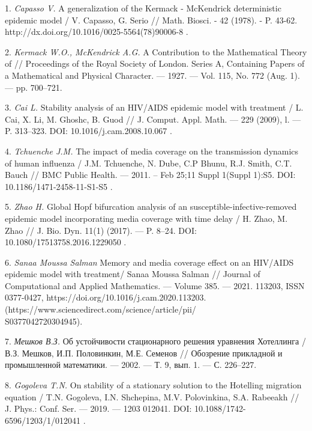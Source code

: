 \litlist

1. {\it  Capasso V.} A generalization of the Kermack - McKendrick
deterministic epidemic model / V. Capasso, G. Serio // Math.
Biosci. - 42 (1978). - P. 43-62.
http://dx.doi.org/10.1016/0025-5564(78)90006-8 .

2. {\it  Kermack W.O.,  McKendrick A.G.} A Contribution to the
Mathematical Theory of  // Proceedings of the Royal Society of
London. Series A, Containing Papers of a Mathematical and Physical
Character. --- 1927. --- Vol. 115, No. 772 (Aug. 1). --- pp.
700--721.

3. {\it   Cai L.} Stability analysis of an HIV/AIDS epidemic model
with treatment / L. Cai, X. Li, M. Ghoshc, B. Guod // J. Comput.
Appl. Math. --- 229 (2009), l. --- P. 313--323. DOI:
10.1016/j.cam.2008.10.067 .

4.  {\it Tchuenche J.M.} The impact of media coverage on the
transmission dynamics of human influenza / J.M. Tchuenche, N.
Dube, C.P Bhunu, R.J. Smith, C.T. Bauch // BMC Public Health. ---
2011. -- Feb 25;11 Suppl 1(Suppl 1):S5. DOI:
10.1186/1471-2458-11-S1-S5 .

5. {\it Zhao H.} Global Hopf bifurcation analysis of an
susceptible-infective-removed epidemic model incorporating media
coverage with time delay / H. Zhao, M. Zhao // J. Bio. Dyn. 11(1)
(2017). --- P. 8--24. DOI: 10.1080/17513758.2016.1229050 .

6. {\it Sanaa Moussa Salman} Memory and media coverage effect on
an HIV/AIDS epidemic model with treatment/ Sanaa Moussa Salman //
Journal of Computational and Applied Mathematics. --- Volume 385.
--- 2021. 113203, ISSN 0377-0427,
https://doi.org/10.1016/j.cam.2020.113203.
(https://www.sciencedirect.com/science/article/pii/\\S0377042720304945).


7. {\it  Мешков В.З.} Об устойчивости стационарного решения
уравнения Хотеллинга / В.З.  Мешков, И.П. Половинкин, М.Е. Семенов
// Обозрение прикладной и промышленной математики. --- 2002. --- Т. 9,
вып. 1. --- С. 226--227.


8. {\it  Gogoleva T.N.} On stability of a stationary solution to
the Hotelling migration equation / T.N. Gogoleva, I.N. Shchepina,
M.V. Polovinkina, S.A. Rabeeakh // J. Phys.: Conf. Ser. --- 2019.
--- 1203 012041. DOI: 10.1088/1742-6596/1203/1/012041 .

